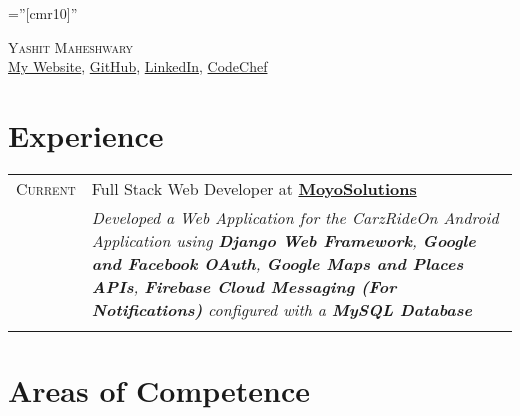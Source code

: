 \documentclass[a4paper,10pt]{article}
\begin{document}
\pagestyle{empty}

\font\fb=''[cmr10]''

\par{\centering
		{\Huge \textsc{Yashit Maheshwary}\\
		}
		\href{https://yashitm.tech/}{My Website}, \href{https://www.github.com/YashitM}{GitHub}, \href{https://www.linkedin.com/in/yashit-maheshwary-aa8078b2/}{LinkedIn}, \href{https://www.codechef.com/users/yashitm}{CodeChef}
	\par}
\noindent{}


\section{Experience}
\begin{tabular}{r|p{13.5cm}}
\textsc{Current} & Full Stack Web Developer at \href{http://www.moyosolutions.online}{\textbf{MoyoSolutions}}\\
& \emph{\small{Developed a Web Application for the CarzRideOn Android Application using \textbf{Django Web Framework}, \textbf{Google and Facebook OAuth}, \textbf{Google Maps and Places APIs}, \textbf{Firebase Cloud Messaging (For Notifications)} configured with a \textbf{MySQL Database}}}\\\multicolumn{2}{c}{}
\end{tabular}


\section{Areas of Competence}
\begin{Parallel}{0.45\textwidth}{0.55\textwidth}
\ParallelPar
\end{Parallel}
\end{document}
